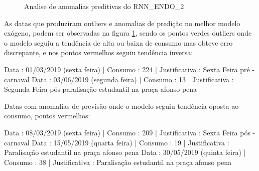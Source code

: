 \documentclass[	12pt, Times, openright, twoside, a4paper, english, brazil]{abntex2}
\begin{document}
            \begin{figure}[!ht]
              \caption{Analise de anomalias preditivas do RNN\_ENDO\_2 \label{fig:case1_rnn_endo2_test_dates} }
            \end{figure}
            
            As datas que produziram outliers e anomalias de predição no melhor modelo exógeno, podem ser observadas na figura \ref{fig:case1_rnn_endo2_test_dates}, sendo os pontos verdes outliers onde o modelo seguiu a tendência de alta ou baixa de consumo mas obteve erro discrepante, e nos pontos vermelhos seguiu tendência inversa:\newline
            
            Data : 01/03/2019 (sexta feira)    | Consumo : 224 | Justificativa : Sexta Feira pré - carnaval\newline
            Data : 03/06/2019 (segunda feira)  | Consumo : 13  | Justificativa : Segunda Feira pós paralisação estudantil na praça afonso pena\newline

            Datas com anomalias de previsão onde o modelo seguiu tendência oposta ao consumo, pontos vermelhos:\newline

            Data : 08/03/2019 (sexta feira)    | Consumo : 209 | Justificativa : Sexta Feira pós - carnaval\newline
            Data : 15/05/2019 (quarta feira)   | Consumo : 19  | Justificativa : Paralisação estudantil na praça afonso pena\newline
            Data : 30/05/2019 (quinta feira)   | Consumo : 38  | Justificativa : Paralisação estudantil na praça afonso pena\newline
\end{document}
